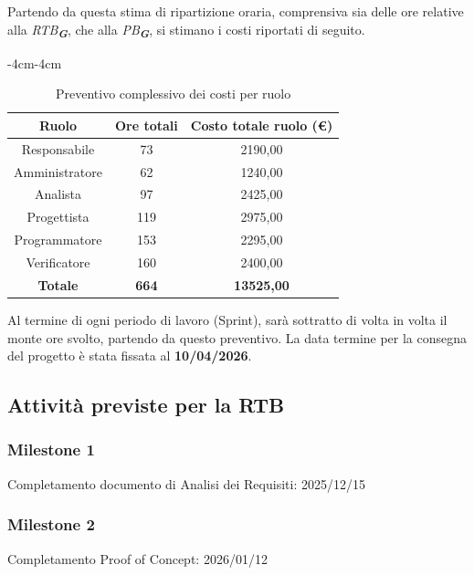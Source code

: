 \documentclass[a4paper,12pt]{article}
\newcommand{\glossario}[1]{\textit{#1}\textsubscript{\textbf{\textit{\textcolor{lightblack}{G}}}}}
\begin{document}
Partendo da questa stima di ripartizione oraria, comprensiva sia delle ore relative alla \glossario{RTB}, che alla \glossario{PB}, si stimano i costi riportati di seguito.
\begin{table}[H]
    \label{tab:preventivo_complessivo}
    \begin{adjustwidth}{-4cm}{-4cm}
    \centering
    \begin{tabular}{|c|c|c|}
        \hline
        \textbf{Ruolo} & \textbf{Ore totali} & \textbf{Costo totale ruolo (€)}  \\
        \hline
        Responsabile & 73 & 2190,00 \\
        \hline
        Amministratore & 62 & 1240,00 \\
        \hline
        Analista & 97 & 2425,00 \\
        \hline
        Progettista & 119 & 2975,00 \\
        \hline
        Programmatore & 153 & 2295,00 \\
        \hline
        Verificatore & 160 & 2400,00 \\
        \hline
        \textbf{Totale} & \textbf{664} & \textbf{13525,00} \\
        \hline
    \end{tabular}
    \caption{Preventivo complessivo dei costi per ruolo}
    \end{adjustwidth}
\end{table}

Al termine di ogni periodo di lavoro (Sprint), sarà sottratto di volta in volta il monte ore svolto, partendo da questo preventivo. La data termine per la consegna del progetto è stata fissata al \textbf{10/04/2026}.


\subsection{Attività previste per la RTB}

\subsubsection*{Milestone 1}
Completamento documento di Analisi dei Requisiti: 2025/12/15 

\subsubsection*{Milestone 2}
Completamento Proof of Concept: 2026/01/12 
\end{document}
